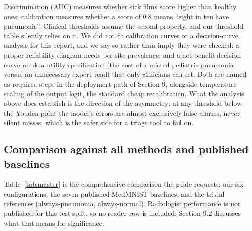 \documentclass[11pt,a4paper]{article}
\begin{document}
Discrimination (AUC) measures whether sick films score higher than healthy ones; calibration measures whether a score of 0.8 means ``eight in ten have pneumonia''. Clinical thresholds assume the second property, and our threshold table silently relies on it. We did not fit calibration curves or a decision-curve analysis for this report, and we say so rather than imply they were checked: a proper reliability diagram needs per-site prevalence, and a net-benefit decision curve needs a utility specification (the cost of a missed pediatric pneumonia versus an unnecessary expert read) that only clinicians can set. Both are named as required steps in the deployment path of Section 9, alongside temperature scaling of the output logit, the standard cheap recalibration. What the analysis above does establish is the direction of the asymmetry: at any threshold below the Youden point the model's errors are almost exclusively false alarms, never silent misses, which is the safer side for a triage tool to fail on.

\subsection{Comparison against all methods and published baselines}

Table~\ref{tab:master} is the comprehensive comparison the guide requests: our six configurations, the seven published MedMNIST baselines, and the trivial references (always-pneumonia, always-normal). Radiologist performance is not published for this test split, so no reader row is included; Section 9.2 discusses what that means for significance.
\end{document}
